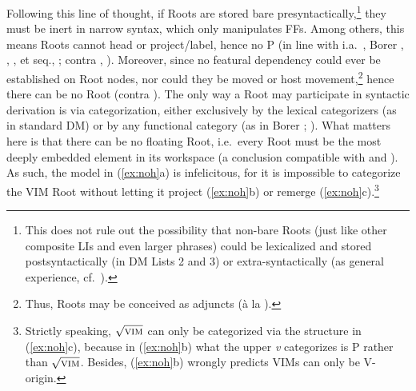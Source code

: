 \documentclass[output=paper]{langsci/langscibook}
\begin{document}
Following this line of thought, if Roots are stored bare
presyntactically,\footnote{This does not rule out the possibility that non-bare
Roots (just like other composite LIs and even larger phrases) could be
lexicalized and stored postsyntactically (in \gls{DM} Lists 2 and 3) or
extra-syntactically (as general experience, cf.\ \citealt{Marantz2013}).} they
must be inert in narrow syntax, which only manipulates FFs. Among others, this
means Roots cannot head or project/label, hence no {\textsurd}P (in line with
i.a.\ \citealt{Acquaviva2009}, Borer \citeyear{Borer2009}, \citeyear{Borer2014},
\citealt{Chomsky2013}, \citealt{deBelder2011} et seq., \citealt{Alexiadou2014};
contra \citealt{Cuervo2014}, \citealt{Harley2014}). Moreover, since no featural
dependency could ever be established on Root nodes, nor could they be moved or
host movement,\footnote{Thus, Roots may be conceived as adjuncts (\`{a} la
\citealt{Marantz2013}).} hence there can be no Root  (contra
\citealt{Harley2009}). The only way a Root may participate in syntactic
derivation is via categorization, either exclusively by the lexical
categorizers (as in standard \gls{DM}) or by any functional category (as in
Borer \citeyear{Borer2005,Borer2013}; \citealt{Biberauer2016,Song2017roots}).
What matters here is that there can be no floating Root, i.e.\ every Root must be
the most deeply embedded element in its workspace (a conclusion compatible with
\citealt{Marantz2001b} and \citealt{Boeckx2014}). As such, the model in
(\ref{ex:noh}a) is infelicitous, for it is impossible to categorize the
\gls{VIM} Root without letting it project
(\ref{ex:noh}b) or remerge (\ref{ex:noh}c).\footnote{Strictly speaking,
    $\sqrt{\textrm{\textsc{vim}}}$ can only be categorized via the
     structure in (\ref{ex:noh}c), because in (\ref{ex:noh}b)
    what the upper {\em v} categorizes is {\textsurd}P rather than
    $\sqrt{\textrm{\textsc{vim}}}$.  Besides, (\ref{ex:noh}b) wrongly predicts
\glspl{VIM} can only be V-origin.}
\end{document}
